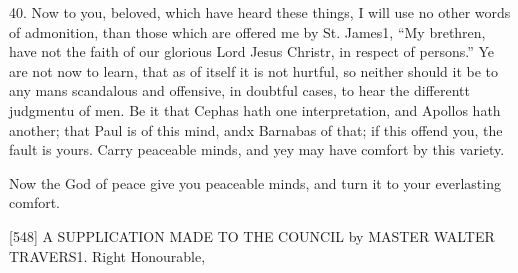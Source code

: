 40. Now to you, beloved, which have heard these things, I will use no other words of admonition, than those which are offered me by St. James1, “My brethren, have not the faith of our glorious Lord Jesus Christr, in respect of persons.” Ye are not now to learn, that as of itself it is not hurtful, so neither should it be to any mans scandalous and offensive, in doubtful cases, to hear the differentt judgmentu of men. Be it that Cephas hath one interpretation, and Apollos hath another; that Paul is of this mind, andx Barnabas of that; if this offend you, the fault is yours. Carry peaceable minds, and yey may have comfort by this variety.

Now the God of peace give you peaceable minds, and turn it to your everlasting comfort.

[548]
A SUPPLICATION MADE TO THE COUNCIL
by MASTER WALTER TRAVERS1.
Right Honourable,
